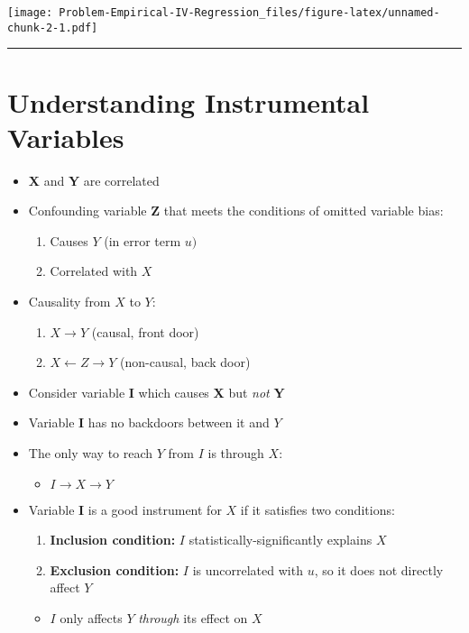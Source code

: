 \documentclass[
]{article}
\providecommand{\tightlist}{%
  \setlength{\itemsep}{0pt}\setlength{\parskip}{0pt}}
\begin{document}
\texttt{[image: Problem-Empirical-IV-Regression\_files/figure-latex/unnamed-chunk-2-1.pdf]}

\begin{center}\rule{0.5\linewidth}{0.5pt}\end{center}

\hypertarget{understanding-instrumental-variables}{%
\section{Understanding Instrumental
Variables}\label{understanding-instrumental-variables}}

\begin{itemize}
\item
  \textbf{X} and \textbf{Y} are correlated
\item
  Confounding variable \textbf{Z} that meets the conditions of omitted
  variable bias:

  \begin{enumerate}
  \def\labelenumi{\arabic{enumi}.}
  \tightlist
  \item
    Causes \(Y\) (in error term \(u)\)
  \item
    Correlated with \(X\)
  \end{enumerate}
\item
  Causality from \(X\) to \(Y\):

  \begin{enumerate}
  \def\labelenumi{\arabic{enumi}.}
  \tightlist
  \item
    \(X \rightarrow Y\) (causal, front door)
  \item
    \(X \leftarrow Z \rightarrow Y\) (non-causal, back door)
  \end{enumerate}
\item
  Consider variable \textbf{I} which causes \textbf{X} but \emph{not}
  \textbf{Y}
\item
  Variable \textbf{I} has no backdoors between it and \(Y\)
\item
  The only way to reach \(Y\) from \(I\) is through \(X\):

  \begin{itemize}
  \tightlist
  \item
    \(I \rightarrow X \rightarrow Y\)
  \end{itemize}
\item
  Variable \textbf{I} is a good instrument for \(X\) if it satisfies two
  conditions:

  \begin{enumerate}
  \def\labelenumi{\arabic{enumi}.}
  \tightlist
  \item
    \textbf{Inclusion condition:} \(I\) statistically-significantly
    explains \(X\)
  \item
    \textbf{Exclusion condition:} \(I\) is uncorrelated with \(u\), so
    it does not directly affect \(Y\)
  \end{enumerate}

  \begin{itemize}
  \tightlist
  \item
    \(I\) only affects \(Y\) \emph{through} its effect on \(X\)
  \end{itemize}
\end{itemize}
\end{document}
